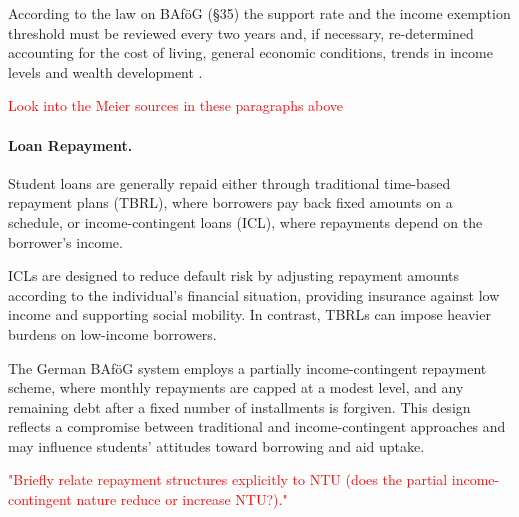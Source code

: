According to the law on BAföG (§35) the support rate and the income exemption threshold must be reviewed every two years and, if necessary, re-determined accounting for the cost of living, general economic conditions, trends in income levels and wealth development \citep{bafoeg_law, meier_zur_2024}.

\textcolor{red}{Look into the Meier sources in these paragraphs above}



\label{subsection:loan-repayment-plan}

\paragraph{Loan Repayment.} Student loans are generally repaid either through traditional time-based repayment plans (TBRL), where borrowers pay back fixed amounts on a schedule, or income-contingent loans (ICL), where repayments depend on the borrower’s income. 

ICLs are designed to reduce default risk by adjusting repayment amounts according to the individual’s financial situation, providing insurance against low income and supporting social mobility. In contrast, TBRLs can impose heavier burdens on low-income borrowers.

The German BAföG system employs a partially income-contingent repayment scheme, where monthly repayments are capped at a modest level, and any remaining debt after a fixed number of installments is forgiven. This design reflects a compromise between traditional and income-contingent approaches and may influence students’ attitudes toward borrowing and aid uptake.

\textcolor{red}{"Briefly relate repayment structures explicitly to NTU (does the partial income-contingent nature reduce or increase NTU?)."}


